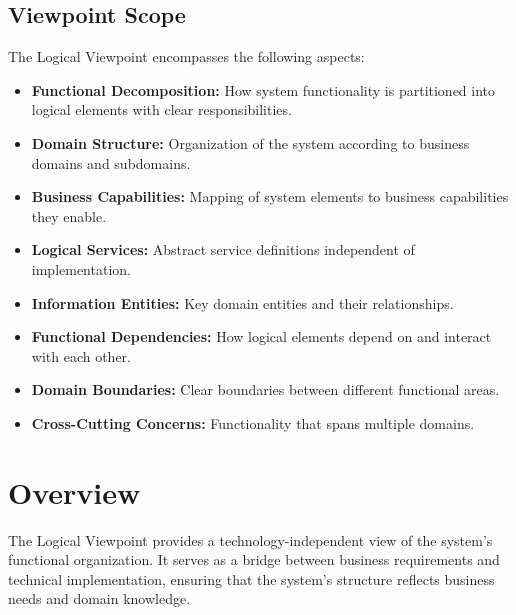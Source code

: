 \documentclass[11pt,letterpaper]{article}
\begin{document}
\subsection{Viewpoint Scope}

The Logical Viewpoint encompasses the following aspects:

\begin{itemize}
    \item \textbf{Functional Decomposition:} How system functionality is partitioned into logical elements with clear responsibilities.
    
    \item \textbf{Domain Structure:} Organization of the system according to business domains and subdomains.
    
    \item \textbf{Business Capabilities:} Mapping of system elements to business capabilities they enable.
    
    \item \textbf{Logical Services:} Abstract service definitions independent of implementation.
    
    \item \textbf{Information Entities:} Key domain entities and their relationships.
    
    \item \textbf{Functional Dependencies:} How logical elements depend on and interact with each other.
    
    \item \textbf{Domain Boundaries:} Clear boundaries between different functional areas.
    
    \item \textbf{Cross-Cutting Concerns:} Functionality that spans multiple domains.
\end{itemize}

\section{Overview}

The Logical Viewpoint provides a technology-independent view of the system's functional organization. It serves as a bridge between business requirements and technical implementation, ensuring that the system's structure reflects business needs and domain knowledge.
\end{document}
